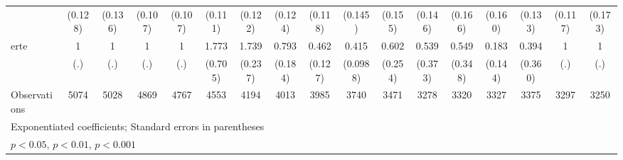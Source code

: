 {\begin{tabular}{l*{16}{c}}
                    &     (0.128)         &     (0.136)         &     (0.107)         &     (0.107)         &     (0.111)         &     (0.122)         &     (0.124)         &     (0.118)         &     (0.145)         &     (0.155)         &     (0.146)         &     (0.166)         &     (0.160)         &     (0.133)         &     (0.117)         &     (0.173)         \\
[1em]
erte                &           1         &           1         &           1         &           1         &       1.773         &       1.739\sym{***}&       0.793         &       0.462\sym{**} &       0.415\sym{***}&       0.602         &       0.539         &       0.549         &       0.183\sym{*}  &       0.394         &           1         &           1         \\
                    &         (.)         &         (.)         &         (.)         &         (.)         &     (0.705)         &     (0.237)         &     (0.184)         &     (0.127)         &    (0.0988)         &     (0.254)         &     (0.373)         &     (0.348)         &     (0.144)         &     (0.360)         &         (.)         &         (.)         \\
\hline
Observations        &        5074         &        5028         &        4869         &        4767         &        4553         &        4194         &        4013         &        3985         &        3740         &        3471         &        3278         &        3320         &        3327         &        3375         &        3297         &        3250         \\
\hline\hline
\multicolumn{17}{l}{\footnotesize Exponentiated coefficients; Standard errors in parentheses}\\
\multicolumn{17}{l}{\footnotesize \sym{*} \(p<0.05\), \sym{**} \(p<0.01\), \sym{***} \(p<0.001\)}\\
\end{tabular}
}
